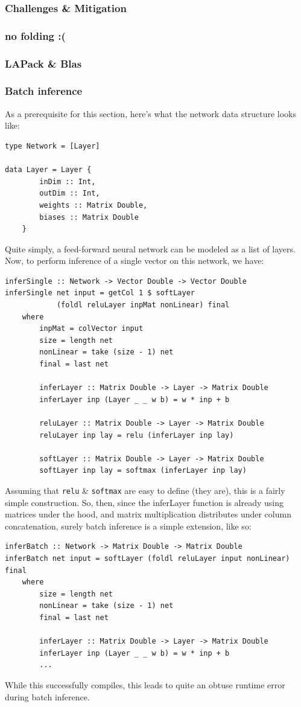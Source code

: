 \documentclass[12pt, titlepage]{article}
\begin{document}
\subsubsection{Challenges \& Mitigation}
\subsubsection{no folding :(}
\subsubsection{LAPack \& Blas}

\subsubsection{Batch inference}
As a prerequisite for this section, here's what the network data structure looks like:
\begin{lstlisting}
type Network = [Layer]

data Layer = Layer {
		inDim :: Int,
		outDim :: Int,
		weights :: Matrix Double,
		biases :: Matrix Double
	}
\end{lstlisting}
Quite simply, a feed-forward neural network can be modeled as a list of layers. Now, to perform inference of a single vector on this network, we have:
\begin{lstlisting}
inferSingle :: Network -> Vector Double -> Vector Double
inferSingle net input = getCol 1 $ softLayer 
			(foldl reluLayer inpMat nonLinear) final
	where
		inpMat = colVector input
		size = length net
		nonLinear = take (size - 1) net
		final = last net

		inferLayer :: Matrix Double -> Layer -> Matrix Double
		inferLayer inp (Layer _ _ w b) = w * inp + b

		reluLayer :: Matrix Double -> Layer -> Matrix Double
		reluLayer inp lay = relu (inferLayer inp lay)

		softLayer :: Matrix Double -> Layer -> Matrix Double
		softLayer inp lay = softmax (inferLayer inp lay)
\end{lstlisting}
Assuming that \verb|relu| \& \verb|softmax| are easy to define (they are), this is a fairly simple construction. So, then, since the inferLayer function is already using matrices under the hood, and matrix multiplication distributes under column concatenation, surely batch inference is a simple extension, like so:
\begin{lstlisting}
inferBatch :: Network -> Matrix Double -> Matrix Double
inferBatch net input = softLayer (foldl reluLayer input nonLinear) final
	where
		size = length net
		nonLinear = take (size - 1) net
		final = last net

		inferLayer :: Matrix Double -> Layer -> Matrix Double
		inferLayer inp (Layer _ _ w b) = w * inp + b
		...
\end{lstlisting}
While this successfully compiles, this leads to quite an obtuse runtime error during batch inference.\medskip
\end{document}
